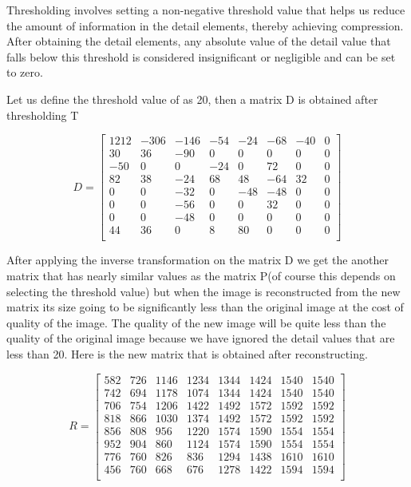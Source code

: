 \documentclass{article}
\begin{document}
\setlength{\parindent}{1cm}
Thresholding involves setting a non-negative threshold value that helps us reduce the amount of information in the detail elements, thereby achieving compression. After obtaining the detail elements, any absolute value of the detail value that falls below this threshold is considered insignificant or negligible and can be set to zero. 

\setlength{\parindent}{1cm}
Let us define the threshold value of as 20, then a matrix D is obtained after thresholding T 

\begin{equation*}
D =
\begin{bmatrix}
1212 & -306 & -146 & -54 & -24 & -68 & -40 & 0 \\
30 & 36 & -90 & 0 & 0 & 0 & 0 & 0 \\
-50 & 0 & 0 & -24 & 0 & 72 & 0 & 0 \\
82 & 38 & -24 & 68 & 48 & -64 & 32 & 0 \\
0 & 0 & -32 & 0 & -48 & -48 & 0 & 0 \\
0 & 0 & -56 & 0 & 0 & 32 & 0 & 0 \\
0 & 0 & -48 & 0 & 0 & 0 & 0 & 0 \\
44 & 36 & 0 & 8 & 80 & 0 & 0 & 0 \\
\end{bmatrix}
\end{equation*}

\setlength{\parindent}{1cm}
After applying the inverse transformation on the matrix D we get the another matrix that has nearly similar values as the matrix P(of course this depends on selecting the threshold value) but when the image is reconstructed from the new matrix its size going to be significantly less than the original image at the cost of quality of the image. The quality of the new image will be quite less than the quality of the original image because we have ignored the detail values that are less than 20. Here is the new matrix that is obtained after reconstructing. 


\begin{equation*}
R = \begin{bmatrix}
582 & 726 & 1146 & 1234 & 1344 & 1424 & 1540 & 1540 \\
742 & 694 & 1178 & 1074 & 1344 & 1424 & 1540 & 1540 \\
706 & 754 & 1206 & 1422 & 1492 & 1572 & 1592 & 1592 \\
818 & 866 & 1030 & 1374 & 1492 & 1572 & 1592 & 1592 \\
856 & 808 & 956 & 1220 & 1574 & 1590 & 1554 & 1554 \\
952 & 904 & 860 & 1124 & 1574 & 1590 & 1554 & 1554 \\
776 & 760 & 826 & 836 & 1294 & 1438 & 1610 & 1610 \\
456 & 760 & 668 & 676 & 1278 & 1422 & 1594 & 1594 \\
\end{bmatrix}
\end{equation*}
\end{document}

